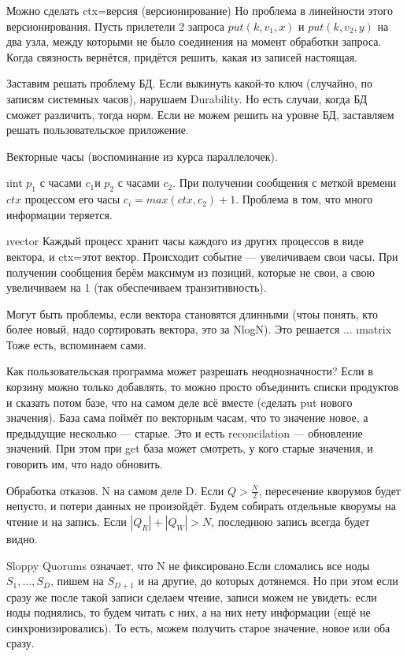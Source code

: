 Можно сделать ctx=версия (версионирование)
Но проблема в линейности этого версионирования.
Пусть прилетели 2 запроса $put(k, v_1, x)$ и $put(k, v_2, y)$ на два узла, между которыми не было соединения на момент обработки запроса. Когда связность вернётся, придётся решить, какая из записей настоящая.

Заставим решать проблему БД.
Если выкинуть какой-то ключ (случайно, по записям системных часов), нарушаем Durability. Но есть случаи, когда БД сможет различить, тогда норм.
Если не можем решить на уровне БД, заставляем решать пользовательское приложение.

Векторные часы (воспоминание из курса параллелочек).
\begin{enumerate}
\i int
$p_1$ с часами $c_1$и $p_2$ с часами $c_2$. При получении сообщения с меткой времени $ctx$ процессом его часы $c_i = max(ctx, c_2)+1$. 
Проблема в том, что много информации теряется.

\i vector
Каждый процесс хранит часы каждого из других процессов в виде вектора, и ctx=этот вектор. Происходит событие --- увеличиваем свои часы. При получении сообщения берём максимум из позиций, которые не свои, а свою увеличиваем на 1 (так обеспечиваем транзитивность).

Могут быть проблемы, если вектора становятся длинными (чтоы понять, кто более новый, надо сортировать вектора, это за NlogN). Это решается ...
\i matrix
Тоже есть, вспоминаем сами.
\end{enumerate}

Как пользовательская программа может разрешать неоднозначности?
Если в корзину можно только добавлять, то можно просто объединить списки продуктов и сказать потом базе, что на самом деле всё вместе (cделать put нового значения). 
База сама поймёт по векторным часам, что то значение новое, а предыдущие несколько --- старые.
Это и есть reconcilation --- обновление значений.
При этом при get база может смотреть, у кого старые значения, и говорить им, что надо обновить.

Обработка отказов.
N на самом деле D.
Если $Q>\frac{N}{2}$, пересечение кворумов будет непусто, и потери данных не произойдёт.
Будем собирать отдельные кворумы на чтение и на запись. Если $|Q_R| + |Q_W|>N$, последнюю запись всегда будет видно.

Sloppy Quorums означает, что N не фиксировано.Если сломались все ноды $S_1, \dots, S_D$, пишем на $S_{D+1}$ и на другие, до которых дотянемся. Но при этом если сразу же после такой записи сделаем чтение, записи можем не увидеть: если ноды поднялись, то будем читать с них, а на них нету информации (ещё не синхронизировались). То есть, можем получить старое значение, новое или оба сразу.

